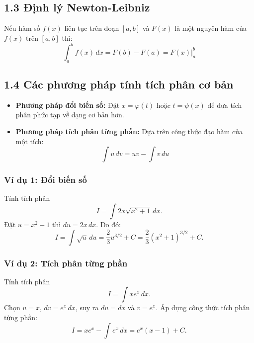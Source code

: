 \documentclass[12pt,a4paper]{article}
\begin{document}
\subsection{1.3 Định lý Newton-Leibniz}
\begin{center}
\end{center}
Nếu hàm số $f(x)$ liên tục trên đoạn $[a, b]$ và $F(x)$ là một nguyên hàm của $f(x)$ trên $[a, b]$ thì:
\begin{equation}
\int_{a}^{b} f(x) \, dx = F(b) - F(a) = F(x) \Big|_{a}^{b}
\end{equation}

\subsection{1.4 Các phương pháp tính tích phân cơ bản}
\begin{itemize}
    \item \textbf{Phương pháp đổi biến số:} Đặt $x = \varphi(t)$ hoặc $t = \psi(x)$ để đưa tích phân phức tạp về dạng cơ bản hơn.
    \item \textbf{Phương pháp tích phân từng phần:} Dựa trên công thức đạo hàm của một tích:
    \begin{equation}
    \int u \, dv = uv - \int v \, du
    \end{equation}
\end{itemize}

\subsubsection*{Ví dụ 1: Đổi biến số}
Tính tích phân
\[
I=\int 2x\sqrt{x^2+1}\,dx.
\]
Đặt $u=x^2+1$ thì $du=2x\,dx$. Do đó:
\[
I=\int \sqrt{u}\,du
=\frac{2}{3}u^{3/2}+C
=\frac{2}{3}(x^2+1)^{3/2}+C.
\]

\subsubsection*{Ví dụ 2: Tích phân từng phần}
Tính tích phân
\[
I=\int x e^x\,dx.
\]
Chọn $u=x$, $dv=e^x\,dx$, suy ra $du=dx$ và $v=e^x$. Áp dụng công thức tích phân từng phần:
\[
I=xe^x-\int e^x\,dx
=e^x(x-1)+C.
\]
\end{document}
